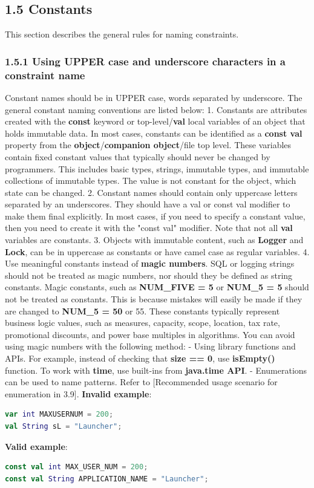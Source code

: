 \subsection*{\textbf{1.5 Constants}}
\label{sec:1.5}
This section describes the general rules for naming constraints.
\subsubsection*{\textbf{1.5.1 Using UPPER case and underscore characters in a constraint name}}
\leavevmode\newline
\label{sec:1.5.1}
Constant names should be in UPPER case, words separated by underscore. The general constant naming conventions are listed below:
1. Constants are attributes created with the \textbf{const} keyword or top-level/\textbf{val} local variables of an object that holds immutable data. In most cases, constants can be identified as a \textbf{const val} property from the \textbf{object}/\textbf{companion object}/file top level. These variables contain fixed constant values that typically should never be changed by programmers. This includes basic types, strings, immutable types, and immutable collections of immutable types. The value is not constant for the object, which state can be changed.
2. Constant names should contain only uppercase letters separated by an underscores. They should have a val or const val modifier to make them final explicitly. In most cases, if you need to specify a constant value, then you need to create it with the "const val" modifier. Note that not all \textbf{val} variables are constants.
3. Objects with immutable content, such as \textbf{Logger} and \textbf{Lock}, can be in uppercase as constants or have camel case as regular variables.
4. Use meaningful constants instead of \textbf{magic numbers}. SQL or logging strings should not be treated as magic numbers, nor should they be defined as string constants.
Magic constants, such as \textbf{NUM\_FIVE = 5} or \textbf{NUM\_5 = 5} should not be treated as constants. This is because mistakes will easily be made if they are changed to \textbf{NUM\_5 = 50} or 55.
These constants typically represent business logic values, such as measures, capacity, scope, location, tax rate, promotional discounts, and power base multiples in algorithms.
You can avoid using magic numbers with the following method:
- Using library functions and APIs. For example, instead of checking that \textbf{size == 0}, use \textbf{isEmpty()} function. To work with \textbf{time}, use built-ins from \textbf{java.time API}.
- Enumerations can be used to name patterns. Refer to [Recommended usage scenario for enumeration in 3.9].
\textbf{Invalid example}: 
\begin{lstlisting}[language=Kotlin]
var int MAXUSERNUM = 200;
val String sL = "Launcher";
\end{lstlisting}
\textbf{Valid example}:
\begin{lstlisting}[language=Kotlin]
const val int MAX_USER_NUM = 200;
const val String APPLICATION_NAME = "Launcher";
\end{lstlisting}
